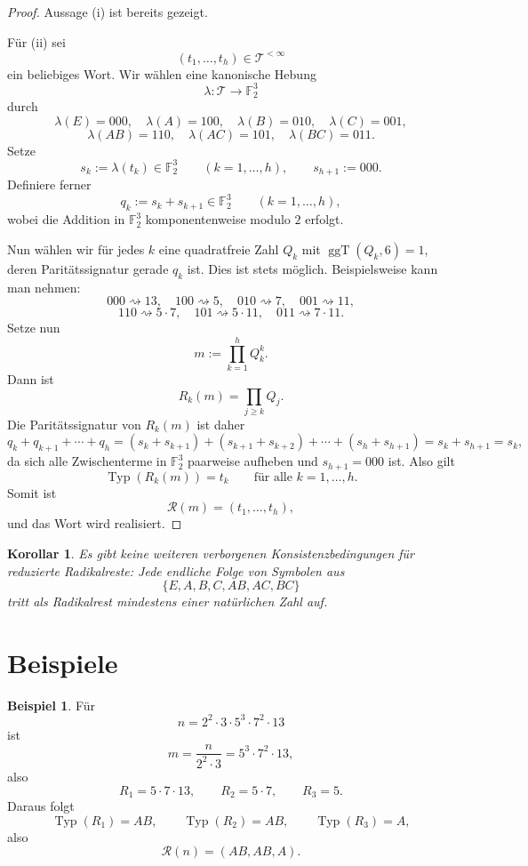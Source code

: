\documentclass[11pt,a4paper]{article}
\newtheorem{korollar}[satz]{Korollar}
\theoremstyle{definition}
\newtheorem{beispiel}[satz]{Beispiel}
\theoremstyle{remark}
\newcommand{\F}{\mathbb{F}_2}
\newcommand{\Typ}{\operatorname{Typ}}
\newcommand{\RRest}{\mathcal{R}}
\newcommand{\ggT}{\operatorname{ggT}}
\begin{document}
	\begin{proof}
		Aussage \textup{(i)} ist bereits gezeigt.
		
		Für \textup{(ii)} sei
		\[
		(t_1,\dots,t_h)\in\mathcal T^{<\infty}
		\]
		ein beliebiges Wort. Wir wählen eine kanonische Hebung
		\[
		\lambda:\mathcal T\to\F^3
		\]
		durch
		\[
		\lambda(E)=000,\quad \lambda(A)=100,\quad \lambda(B)=010,\quad \lambda(C)=001,
		\]
		\[
		\lambda(AB)=110,\quad \lambda(AC)=101,\quad \lambda(BC)=011.
		\]
		Setze
		\[
		s_k:=\lambda(t_k)\in\F^3
		\qquad (k=1,\dots,h),
		\qquad
		s_{h+1}:=000.
		\]
		Definiere ferner
		\[
		q_k:=s_k+s_{k+1}\in\F^3
		\qquad (k=1,\dots,h),
		\]
		wobei die Addition in \(\F^3\) komponentenweise modulo \(2\) erfolgt.
		
		Nun wählen wir für jedes \(k\) eine quadratfreie Zahl \(Q_k\) mit \(\ggT(Q_k,6)=1\), deren
		Paritätssignatur gerade \(q_k\) ist. Dies ist stets möglich. Beispielsweise kann man nehmen:
		\[
		000\rightsquigarrow 13,\quad
		100\rightsquigarrow 5,\quad
		010\rightsquigarrow 7,\quad
		001\rightsquigarrow 11,
		\]
		\[
		110\rightsquigarrow 5\cdot 7,\quad
		101\rightsquigarrow 5\cdot 11,\quad
		011\rightsquigarrow 7\cdot 11.
		\]
		Setze nun
		\[
		m:=\prod_{k=1}^{h}Q_k^k.
		\]
		Dann ist
		\[
		R_k(m)=\prod_{j\ge k}Q_j.
		\]
		Die Paritätssignatur von \(R_k(m)\) ist daher
		\[
		q_k+q_{k+1}+\cdots+q_h
		=(s_k+s_{k+1})+(s_{k+1}+s_{k+2})+\cdots+(s_h+s_{h+1})
		=s_k+s_{h+1}=s_k,
		\]
		da sich alle Zwischenterme in \(\F^3\) paarweise aufheben und \(s_{h+1}=000\) ist. Also gilt
		\[
		\Typ(R_k(m))=t_k
		\qquad\text{für alle }k=1,\dots,h.
		\]
		Somit ist
		\[
		\RRest(m)=(t_1,\dots,t_h),
		\]
		und das Wort wird realisiert.
	\end{proof}
	
	\begin{korollar}
		Es gibt keine weiteren verborgenen Konsistenzbedingungen für reduzierte Radikalreste: Jede endliche
		Folge von Symbolen aus
		\[
		\{E,A,B,C,AB,AC,BC\}
		\]
		tritt als Radikalrest mindestens einer natürlichen Zahl auf.
	\end{korollar}
	
	\section{Beispiele}
	
	\begin{beispiel}
		Für
		\[
		n=2^2\cdot 3\cdot 5^3\cdot 7^2\cdot 13
		\]
		ist
		\[
		m=\frac{n}{2^2\cdot 3}=5^3\cdot 7^2\cdot 13,
		\]
		also
		\[
		R_1=5\cdot 7\cdot 13,\qquad R_2=5\cdot 7,\qquad R_3=5.
		\]
		Daraus folgt
		\[
		\Typ(R_1)=AB,\qquad \Typ(R_2)=AB,\qquad \Typ(R_3)=A,
		\]
		also
		\[
		\RRest(n)=(AB,AB,A).
		\]
	\end{beispiel}
	
\end{document}
